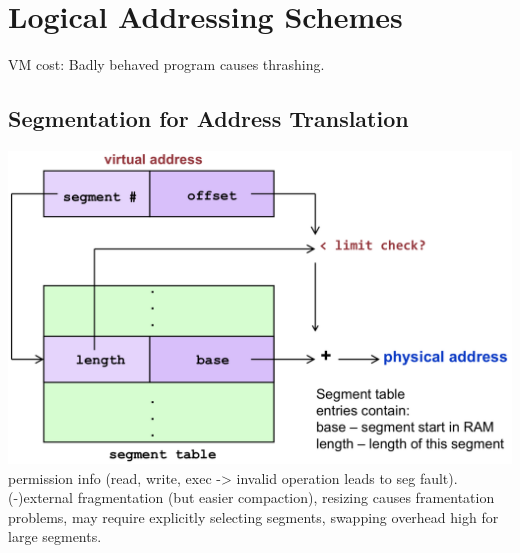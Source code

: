 \section{Logical Addressing Schemes}
VM cost: Badly behaved program causes thrashing.

\subsection*{Segmentation for Address Translation}
\includegraphics[width=0.75\linewidth]{images/segmentation-scheme}\\
permission info (read, write, exec -> invalid operation leads to seg fault).\\
(-)external fragmentation (but easier compaction), resizing causes framentation problems, may require explicitly selecting segments, swapping overhead high for large segments.

